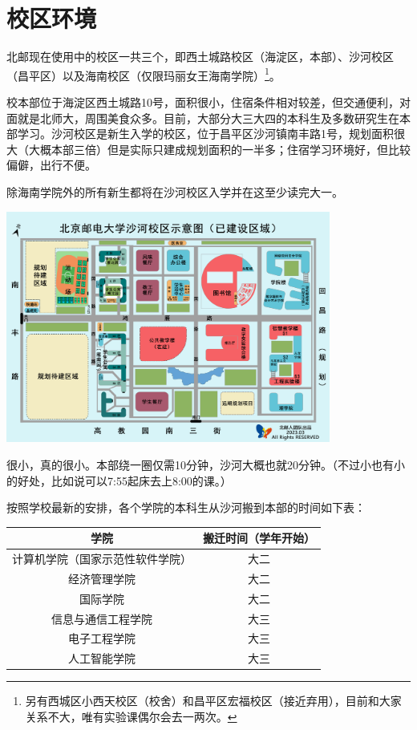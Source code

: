 \section{校区环境}

北邮现在使用中的校区一共三个，即西土城路校区（海淀区，本部）、沙河校区（昌平区）以及海南校区（仅限玛丽女王海南学院）\footnote{另有西城区小西天校区（校舍）和昌平区宏福校区（接近弃用），目前和大家关系不大，唯有实验课偶尔会去一两次。}。

校本部位于海淀区西土城路10号，面积很小，住宿条件相对较差，但交通便利，对面就是北师大，周围美食众多。目前，大部分大三大四的本科生及多数研究生在本部学习。沙河校区是新生入学的校区，位于昌平区沙河镇南丰路1号，规划面积很大（大概本部三倍）但是实际只建成规划面积的一半多；住宿学习环境好，但比较偏僻，出行不便。

除海南学院外的所有新生都将在沙河校区入学并在这至少读完大一。

\begin{center}
    \includegraphics[width=0.80\textwidth]{images/shahe-map.jpg}
\end{center}


很小，真的很小。本部绕一圈仅需10分钟，沙河大概也就20分钟。{\small （不过小也有小的好处，比如说可以7:55起床去上8:00的课。）}


按照学校最新的安排，各个学院的本科生从沙河搬到本部的时间如下表：

\begin{center}
    \begin{tabular}{cc}
        \toprule
        学院 & 搬迁时间（学年开始） \\
        \midrule
        计算机学院（国家示范性软件学院） & 大二 \\
        经济管理学院 & 大二 \\
        国际学院 & 大二\\
        信息与通信工程学院 & 大三 \\
        电子工程学院 & 大三 \\
        人工智能学院 & 大三 \\
        \bottomrule
    \end{tabular}
\end{center}

